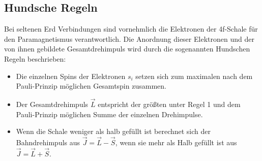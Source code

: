 \subsection{Hundsche Regeln}
Bei seltenen Erd Verbindungen sind vornehmlich die Elektronen der 4f-Schale für den Paramagnetismus verantwortlich. Die Anordnung dieser Elektronen und der von ihnen gebildete Gesamtdrehimpuls wird durch die sogenannten Hundschen Regeln beschrieben:
\begin{itemize}
\item Die einzelnen Spins der Elektronen $s_i$ setzen sich zum maximalen nach dem Pauli-Prinzip möglichen Gesamtspin zusammen.
\item Der Gesamtdrehimpuls $\vec{L}$ entspricht der größten unter Regel 1 und dem Pauli-Prinzip möglichen Summe der einzelnen Drehimpulse.
\item Wenn die Schale weniger als halb gefüllt ist berechnet sich der Bahndrehimpuls aus $\vec{J}=\vec{L}-\vec{S}$, wenn sie mehr als Halb gefüllt ist aus $\vec{J}=\vec{L}+\vec{S}$.
\end{itemize}
